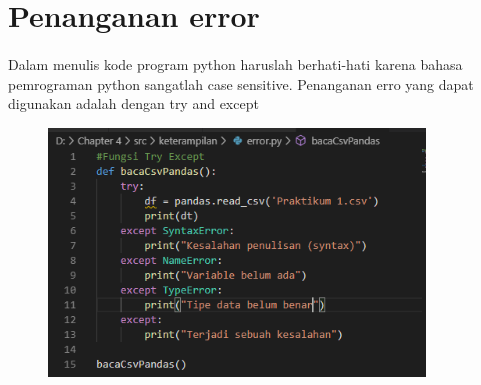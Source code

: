 \documentclass{article}
\begin{document}
\newpage
\section{Penanganan error}
    \paragraph{}Dalam menulis kode program python haruslah berhati-hati karena bahasa pemrograman python sangatlah case sensitive. Penanganan erro yang dapat digunakan adalah dengan try and except
   \begin{figure}[ht]
            \centerline{\includegraphics[width=10cm]{figure/k.PNG}}
            \end{figure}
    

  
\end{document}
